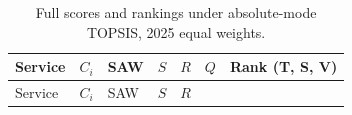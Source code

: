 \documentclass[
  12pt,
  letterpaper,
  12pt,
  oneside,
  english,
  onehalfspacing,
  headsepline]{MastersDoctoralThesis}
\begin{document}
\begin{longtable}[]{@{}
  >{\raggedright\arraybackslash}p{}
  >{\raggedleft\arraybackslash}p{}
  >{\raggedleft\arraybackslash}p{}
  >{\raggedleft\arraybackslash}p{}
  >{\raggedleft\arraybackslash}p{}
  >{\raggedleft\arraybackslash}p{}
  >{\centering\arraybackslash}p{}@{}}
\caption{Full scores and rankings under absolute-mode TOPSIS, 2025 equal
weights.}\label{tbl-appc-2025e-abs}\tabularnewline
\toprule\noalign{}
\begin{minipage}[b]{\linewidth}\raggedright
Service
\end{minipage} & \begin{minipage}[b]{\linewidth}\raggedleft
\(C_i\)
\end{minipage} & \begin{minipage}[b]{\linewidth}\raggedleft
SAW
\end{minipage} & \begin{minipage}[b]{\linewidth}\raggedleft
\(S\)
\end{minipage} & \begin{minipage}[b]{\linewidth}\raggedleft
\(R\)
\end{minipage} & \begin{minipage}[b]{\linewidth}\raggedleft
\(Q\)
\end{minipage} & \begin{minipage}[b]{\linewidth}\centering
Rank (T, S, V)
\end{minipage} \\
\midrule\noalign{}
\endfirsthead
\toprule\noalign{}
\begin{minipage}[b]{\linewidth}\raggedright
Service
\end{minipage} & \begin{minipage}[b]{\linewidth}\raggedleft
\(C_i\)
\end{minipage} & \begin{minipage}[b]{\linewidth}\raggedleft
SAW
\end{minipage} & \begin{minipage}[b]{\linewidth}\raggedleft
\(S\)
\end{minipage} & \begin{minipage}[b]{\linewidth}\raggedleft
\(R\)
\end{minipage} & \begin{minipage}[b]{\linewidth}\raggedleft

\end{minipage}
\end{longtable}
\end{document}
